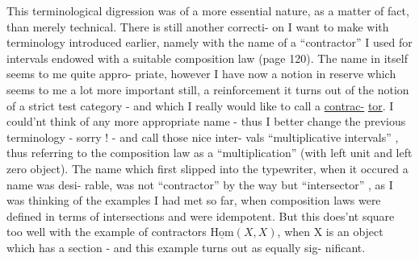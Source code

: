 
This terminological digression was of a more essential nature, as a
matter of fact, than merely technical. There is still another correcti-%
on I want to make with terminology introduced earlier, namely  with
the name of a ``contractor'' I used for intervals endowed with a suitable
composition law (page 120). The name in itself seems to me quite appro-%
priate, however I have now a notion in reserve which seems to me a lot
more important still, a reinforcement it turns out of the notion of a
strict test category - and which I really would like to call a \uline{contrac-}%
\uline{tor}. I could'nt think of any more appropriate name - thus I better
change the previous terminology - sorry ! - and call those nice inter-%
vals ``multiplicative intervals'' , thus referring to the composition law
as a ``multiplication'' (with left unit and left zero object). The name
which first slipped into the typewriter, when it occured a name was desi-%
rable, was not ``contractor'' by the way but ``intersector'' , as I was
thinking of the examples I had met so far, when composition laws were
defined in terms of intersections and were idempotent. But this does'nt
square too well with the example of contractors $\underline{\mathrm{Hom}}(X,X)$, when X is an
object which has a section - and this example turns out as equally sig-%
nificant.

